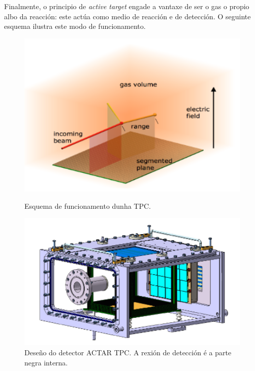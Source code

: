 \documentclass[11pt, a4paper]{article}
\begin{document}
Finalmente, o principio de \textit{active target} engade a vantaxe de ser o gas o propio albo da reacción: este actúa como medio de reacción e de detección. O seguinte esquema ilustra este modo de funcionamento.
\begin{figure}[!ht]
\begin{minipage}[b]{.45\textwidth}
\centering
\includegraphics[width=1\textwidth]{figures/tpc.png}
\caption{Esquema de funcionamento dunha TPC.}
\label{fig:tpc}
\end{minipage}
\hfill
\begin{minipage}[b]{.45\textwidth}
\centering
\includegraphics[width=1\textwidth]{figures/actar.png}
\caption{Deseño do detector ACTAR TPC. A rexión de detección é a parte negra interna.}
\label{fig:actar}
\end{minipage}
\end{figure}
\end{document}
